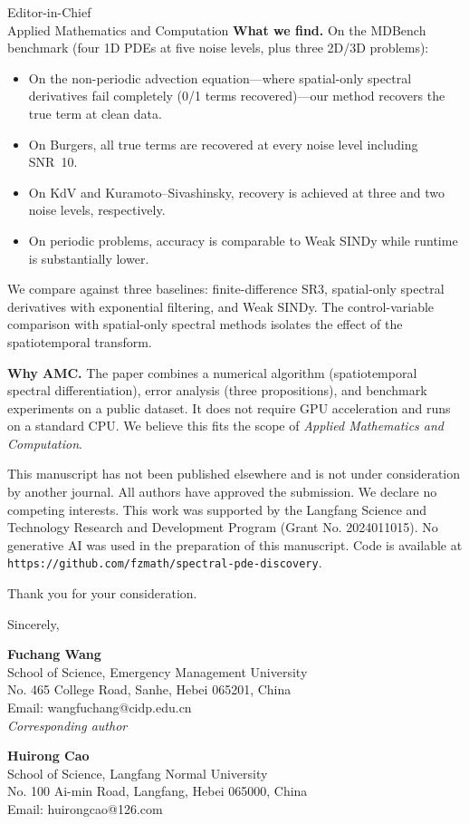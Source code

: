 \documentclass[12pt]{letter}
\begin{document}
\begin{letter}{Editor-in-Chief\\
Applied Mathematics and Computation}
\textbf{What we find.} On the MDBench benchmark (four 1D PDEs at five noise levels, plus three 2D/3D problems):

\begin{itemize}
\item On the non-periodic advection equation---where spatial-only spectral derivatives fail completely (0/1 terms recovered)---our method recovers the true term at clean data.
\item On Burgers, all true terms are recovered at every noise level including SNR~10.
\item On KdV and Kuramoto--Sivashinsky, recovery is achieved at three and two noise levels, respectively.
\item On periodic problems, accuracy is comparable to Weak SINDy while runtime is substantially lower.
\end{itemize}

We compare against three baselines: finite-difference SR3, spatial-only spectral derivatives with exponential filtering, and Weak SINDy. The control-variable comparison with spatial-only spectral methods isolates the effect of the spatiotemporal transform.

\textbf{Why AMC.} The paper combines a numerical algorithm (spatiotemporal spectral differentiation), error analysis (three propositions), and benchmark experiments on a public dataset. It does not require GPU acceleration and runs on a standard CPU. We believe this fits the scope of \textit{Applied Mathematics and Computation}.

This manuscript has not been published elsewhere and is not under consideration by another journal. All authors have approved the submission. We declare no competing interests. This work was supported by the Langfang Science and Technology Research and Development Program (Grant No. 2024011015). No generative AI was used in the preparation of this manuscript. Code is available at \texttt{https://github.com/fzmath/spectral-pde-discovery}.

Thank you for your consideration.

\closing{Sincerely,}

\vspace{0.5cm}
\textbf{Fuchang Wang}\\
School of Science, Emergency Management University\\
No. 465 College Road, Sanhe, Hebei 065201, China\\
Email: wangfuchang@cidp.edu.cn\\
\textit{Corresponding author}

\vspace{0.3cm}
\textbf{Huirong Cao}\\
School of Science, Langfang Normal University\\
No. 100 Ai-min Road, Langfang, Hebei 065000, China\\
Email: huirongcao@126.com

\end{letter}
\end{document}
